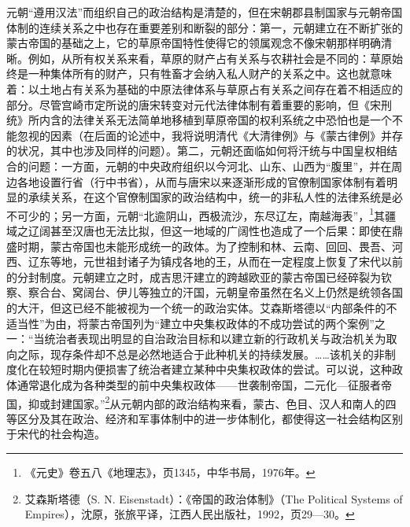 \documentclass[a4paper, 12pt, openright]{ctexbook}
\begin{document}
元朝“遵用汉法”而组织自己的政治结构是清楚的，但在宋朝郡县制国家与元朝帝国体制的连续关系之中也存在重要差别和断裂的部分：第一，元朝建立在不断扩张的蒙古帝国的基础之上，它的草原帝国特性使得它的领属观念不像宋朝那样明确清晰。例如，从所有权关系来看，草原的财产占有关系与农耕社会是不同的：草原始终是一种集体所有的财产，只有牲畜才会纳入私人财产的关系之中。这也就意味着：以土地占有关系为基础的中原法律体系与草原占有关系之间存在着不相适应的部分。尽管宫崎市定所说的唐宋转变对元代法律体制有着重要的影响，但《宋刑统》所内含的法律关系无法简单地移植到草原帝国的权利系统之中恐怕也是一个不能忽视的因素（在后面的论述中，我将说明清代《大清律例》与《蒙古律例》并存的状况，其中也涉及同样的问题）。第二，元朝还面临如何将汗统与中国皇权相结合的问题：一方面，元朝的中央政府组织以今河北、山东、山西为“腹里”，并在周边各地设置行省（行中书省），从而与唐宋以来逐渐形成的官僚制国家体制有着明显的承续关系，在这个官僚制国家的政治结构中，统一的非私人性的法律系统是必不可少的；另一方面，元朝“北逾阴山，西极流沙，东尽辽左，南越海表”，\footnote{《元史》卷五八《地理志》，页1345，中华书局，1976年。}其疆域之辽阔甚至汉唐也无法比拟，但这一地域的广阔性也造成了一个后果：即使在鼎盛时期，蒙古帝国也未能形成统一的政体。为了控制和林、云南、回回、畏吾、河西、辽东等地，元世祖封诸子为镇戍各地的王，从而在一定程度上恢复了宋代以前的分封制度。元朝建立之时，成吉思汗建立的跨越欧亚的蒙古帝国已经碎裂为钦察、察合台、窝阔台、伊儿等独立的汗国，元朝皇帝虽然在名义上仍然是统领各国的大汗，但这已经不能被视为一个统一的政治实体。艾森斯塔德以“内部条件的不适当性”为由，将蒙古帝国列为“建立中央集权政体的不成功尝试的两个案例”之一：“当统治者表现出明显的自治政治目标和以建立新的行政机关与政治机关为取向之际，现存条件却不总是必然地适合于此种机关的持续发展。……该机关的非制度化在较短时期内便损害了统治者建立某种中央集权政体的尝试。可以说，这种政体通常退化成为各种类型的前中央集权政体——世袭制帝国，二元化—征服者帝国，抑或封建国家。”\footnote{艾森斯塔德（S. N. Eisenstadt）：《帝国的政治体制》（The Political Systems of Empires），沈原，张旅平译，江西人民出版社，1992，页29—30。}从元朝内部的政治结构来看，蒙古、色目、汉人和南人的四等区分及其在政治、经济和军事体制中的进一步体制化，都使得这一社会结构区别于宋代的社会构造。
\end{document}
